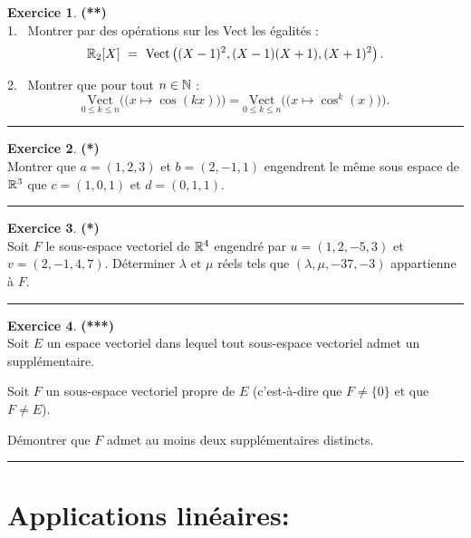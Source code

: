 \documentclass[a4paper,11pt]{article}
\theoremstyle{definition}
\newtheorem{exo}{Exercice} %
\begin{document}
\begin{minipage}{1\linewidth}
\begin{minipage}[t]{0.48\linewidth}
\begin{exo}\textbf{(**)}\quad\\[0.2cm]
1. \ Montrer par des opérations sur les Vect les égalités :\\[-0.5cm]

 $$\mathbb{R}_2 [X ] \ = \  \text{Vect}\left((X - 1)^2 , (X - 1)(X + 1), (X + 1)^2\right)  .$$

2. \ Montrer que pour tout $n \in \mathbb{N}$ :
 $$\underset{0\leq k\leq n}{\text{Vect}}\Big(\big(x\mapsto \cos(kx)\big)\Big)= \underset{0\leq k\leq n}{\text{Vect}}\Big(\big(x\mapsto \cos^k(x)\big)\Big).$$


\centering\rule{1\linewidth}{0.6pt}\end{exo}


\begin{exo}\textbf{(*)}\quad\\[0.2cm]
Montrer que $a=(1,2,3)$ et $b=(2,-1,1)$ engendrent le même sous espace de $\mathbb{R}^3$ que $c=(1,0,1)$ et $d=(0,1,1)$.

\centering\rule{1\linewidth}{0.6pt}\end{exo}

\begin{exo}\textbf{(*)}\quad\\[0.2cm]
Soit $F$ le sous-espace vectoriel de $\mathbb{R}^4$ engendré par $u=(1,2,-5,3)$ et $v=(2,-1,4,7)$. Déterminer $\lambda$ et
$\mu$ réels tels que $(\lambda,\mu,-37,-3)$ appartienne à $F$.
	
	\centering\rule{1\linewidth}{0.6pt}\end{exo}




\begin{exo}\textbf{(***)}\quad\\[0.2cm]
Soit $E$ un espace vectoriel dans lequel tout sous-espace vectoriel admet un supplémentaire.
 
Soit $F$ un sous-espace vectoriel propre de $E$ (c'est-à-dire que $F\neq \{0\}$ et que $F\neq E$). 

Démontrer que $F$ admet au moins deux supplémentaires distincts.

\centering\rule{1\linewidth}{0.6pt}\end{exo}
		
		
\end{minipage}\end{minipage}
                 

\section*{Applications linéaires:}\hfill\\%
\end{document}

